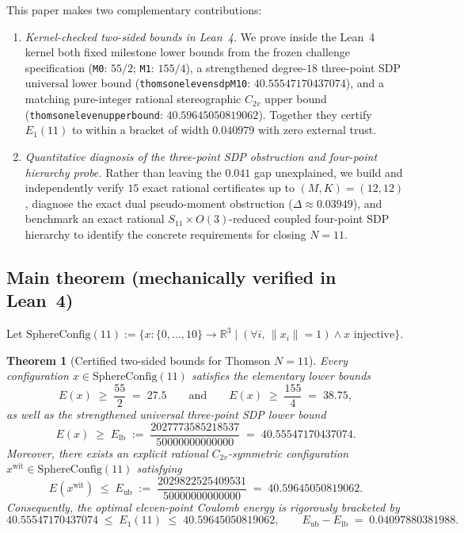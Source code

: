 \documentclass[11pt,reqno]{amsart}
\renewcommand{\_}{\origunderscore\allowbreak}
\newtheorem{theorem}{Theorem}[section]
\theoremstyle{definition}
\newcommand{\R}{\mathbb{R}}
\newcommand{\norm}[1]{\lVert #1 \rVert}
\newcommand{\Elb}{E_{\mathrm{lb}}}
\newcommand{\Eub}{E_{\mathrm{ub}}}
\begin{document}
This paper makes two complementary contributions:
\begin{enumerate}[leftmargin=2.2em]
  \item \emph{Kernel-checked two-sided bounds in Lean~4.} We prove inside the Lean~4 kernel both fixed milestone lower bounds from the frozen challenge specification (\texttt{M0}: $55/2$; \texttt{M1}: $155/4$), a strengthened degree-$18$ three-point SDP universal lower bound (\texttt{thomson\_eleven\_sdp\_M10}: $40.55547170437074$), and a matching pure-integer rational stereographic $C_{2v}$ upper bound (\texttt{thomson\_eleven\_upper\_bound}: $40.59645050819062$). Together they certify $E_1(11)$ to within a bracket of width $0.040979$ with zero external trust.
  \item \emph{Quantitative diagnosis of the three-point SDP obstruction and four-point hierarchy probe.} Rather than leaving the $0.041$ gap unexplained, we build and independently verify $15$ exact rational certificates up to $(M,K) = (12,12)$, diagnose the exact dual pseudo-moment obstruction ($\Delta \approx 0.03949$), and benchmark an exact rational $S_{11} \times O(3)$-reduced coupled four-point SDP hierarchy to identify the concrete requirements for closing $N = 11$.
\end{enumerate}

\subsection{Main theorem (mechanically verified in Lean~4)}\label{subsec:main-thm}
Let $\mathrm{SphereConfig}(11) := \{x : \{0,\dots,10\} \to \R^3 \mid (\forall i,\,\norm{x_i}=1) \wedge x \text{ injective}\}$.

\begin{theorem}[Certified two-sided bounds for Thomson $N = 11$]\label{thm:main}
Every configuration $x \in \mathrm{SphereConfig}(11)$ satisfies the elementary lower bounds
\begin{equation}\label{eq:milestones}
  E(x) \;\ge\; \frac{55}{2} \;=\; 27.5
  \qquad\text{and}\qquad
  E(x) \;\ge\; \frac{155}{4} \;=\; 38.75,
\end{equation}
as well as the strengthened universal three-point SDP lower bound
\begin{equation}\label{eq:sdp-lb}
  E(x) \;\ge\; \Elb \;:=\; \frac{2027773585218537}{50000000000000} \;=\; 40.55547170437074.
\end{equation}
Moreover, there exists an explicit rational $C_{2v}$-symmetric configuration $x^{\mathrm{wit}} \in \mathrm{SphereConfig}(11)$ satisfying
\begin{equation}\label{eq:c2v-ub}
  E(x^{\mathrm{wit}}) \;\le\; \Eub \;:=\; \frac{2029822525409531}{50000000000000} \;=\; 40.59645050819062.
\end{equation}
Consequently, the optimal eleven-point Coulomb energy is rigorously bracketed by
\begin{equation}\label{eq:sandwich}
  40.55547170437074 \;\le\; E_1(11) \;\le\; 40.59645050819062,
  \qquad \Eub - \Elb \;=\; 0.04097880381988.
\end{equation}
\end{theorem}
\end{document}
